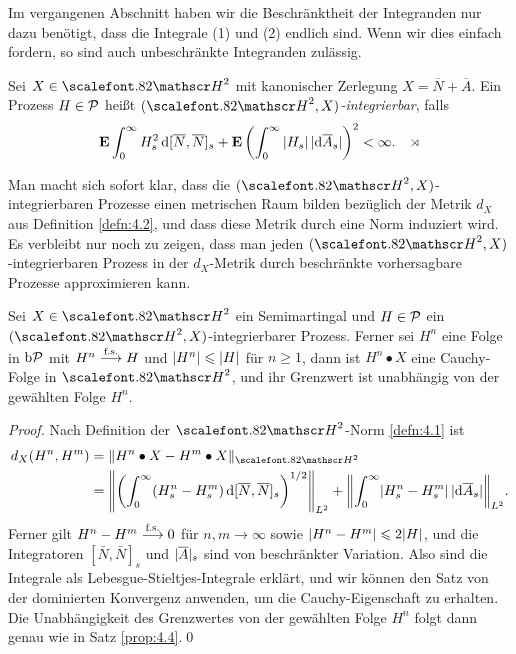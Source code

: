 Im vergangenen Abschnitt haben wir die Beschränktheit der Integranden nur
dazu benötigt, dass die Integrale (1) und (2) endlich sind. Wenn wir dies
einfach fordern, so sind auch unbeschränkte Integranden zulässig.

\begin{definition}
\label{defn:4.5}
Sei $X \in \cH^2$ mit kanonischer Zerlegung
  $X=\overline{N}+\overline{A}$. Ein Prozess $H \in \mathcal{P}$
  heißt \emph{$(\cH^2,X)$-integrierbar}, falls
\begin{align*}
\E\int_0^\infty H^2_s\,\diffd[\overline{N},\overline{N}]_s +
\E\left( \int_0^\infty |H_s| \,|\diffd\overline{A}_s| \right)^2 < \infty.\fish
\end{align*}
\end{definition}

Man macht sich sofort klar, dass die $(\HH^2,X)$-integrierbaren Prozesse einen
metrischen Raum bilden bezüglich der Metrik $d_X$ aus Definition \ref{defn:4.2},
und dass diese Metrik durch eine Norm induziert wird. Es verbleibt nur noch zu
zeigen, dass man jeden $(\HH^2,X)$-integrierbaren Prozess in der $d_X$-Metrik
durch beschränkte vorhersagbare Prozesse approximieren kann. 

\begin{theorem}
\label{prop:4.14}
Sei $X\in\cH^2$ ein Semimartingal und $H\in\mathcal{P}$ ein $(\cH^2,X)$-integrierbarer
Prozess. Ferner sei $H^n$ eine Folge in $\mathrm{b}\mathcal{P}$ mit $H^n\overset{\text{f.s.}}{\longrightarrow} H$ und
$\lvert H^n\rvert\leqslant \lvert H\rvert$ für $n\ge 1$, dann ist $H^n \bullet X$ eine Cauchy-Folge
in $\cH^2$, und ihr Grenzwert ist unabhängig von der gewählten Folge $H^n$.\fish
\end{theorem}
\begin{proof}
Nach Definition der $\HH^2$-Norm \ref{defn:4.1} ist
\begin{align*}
d_X(H^n,H^m) &= \norm{H^n\bullet X - H^m\bullet X}_{\HH^2}\\
&= 
\norm*{\left(\int_0^\infty
(H^n_s-H^m_s)\,\diffd[\bar{N},\bar{N}]_s\right)^{1/2}}_{L^2}
+
\norm*{\int_0^\infty
\abs{H^n_s-H^m_s}\,\abs{\diffd\bar{A}_s}}_{L^2}.
\end{align*}
Ferner gilt $H^n-H^m \overset{\text{f.s.}}{\longrightarrow} 0$ für $n,m\to \infty$ sowie $\lvert H^n-H^m\rvert\leqslant
2\lvert H\rvert$, und die Integratoren $[\bar{N},\bar{N}]_s$ und $\lvert\overline{A}\rvert_s$ sind
von beschränkter Variation. Also sind die Integrale als
Lebesgue-Stieltjes-Integrale erklärt, und wir können den Satz von der
dominierten Konvergenz anwenden, um die Cauchy-Eigenschaft zu erhalten.
Die Unabhängigkeit des Grenzwertes von der gewählten Folge $H^n$ folgt dann
genau wie in Satz \ref{prop:4.4}.\qed
\end{proof}


